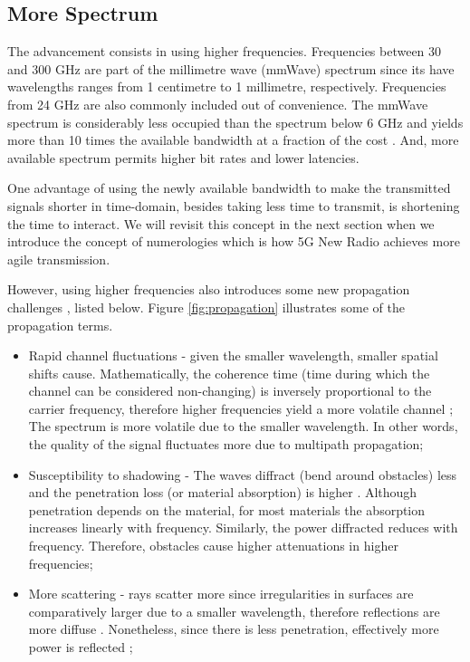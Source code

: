 \subsection*{More Spectrum}

The advancement consists in using higher frequencies. Frequencies between 30 and 300 GHz are part of the millimetre wave (mmWave) spectrum since its have wavelengths ranges from 1 centimetre to 1 millimetre, respectively. Frequencies from 24 GHz are also commonly included out of convenience. The mmWave spectrum is considerably less occupied than the spectrum below 6 GHz and yields more than 10 times the available bandwidth at a fraction of the cost \cite{spectrum_price}. And, more available spectrum permits higher bit rates and lower latencies. %


One advantage of using the newly available bandwidth to make the transmitted signals shorter in time-domain, besides taking less time to transmit, is shortening the time to interact. We will revisit this concept in the next section when we introduce the concept of numerologies which is how 5G New Radio achieves more agile transmission.

However, using higher frequencies also introduces some new propagation challenges \cite{rappaport_potentials_and_challenges, it_will_work}, listed below. Figure \ref{fig:propagation} illustrates some of the propagation terms.

\begin{itemize}
    \item Rapid channel fluctuations - given the smaller wavelength, smaller spatial shifts cause. Mathematically, the coherence time (time during which the channel can be considered non-changing) is inversely proportional to the carrier frequency, therefore higher frequencies yield a more volatile channel \cite{Rappaport_wireless_coms};
    The spectrum is more volatile due to the smaller wavelength. In other words, the quality of the signal fluctuates more due to multipath propagation;
    \item Susceptibility to shadowing - The waves diffract (bend around obstacles) less and the penetration loss (or material absorption) is higher \cite{Rappaport_wireless_coms}. Although penetration depends on the material, for most materials the absorption increases linearly with frequency. Similarly, the power diffracted reduces with frequency. Therefore, obstacles cause higher attenuations in higher frequencies;
    \item More scattering - rays scatter more since irregularities in surfaces are comparatively larger due to a smaller wavelength, therefore reflections are more diffuse \cite{Rappaport_wireless_coms}. Nonetheless, since there is less penetration, effectively more power is reflected \cite{more_reflection};
\end{itemize}

